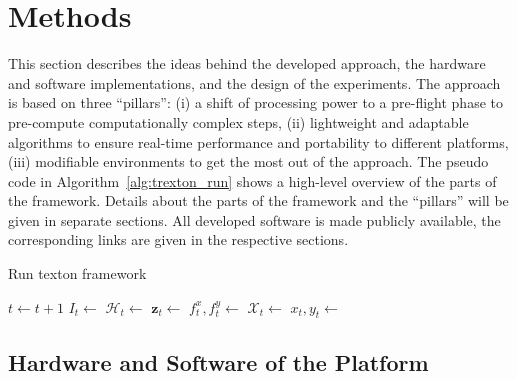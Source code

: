\documentclass{report}
\begin{document}
\chapter{Methods}
\label{chap:methods}

This section describes the ideas behind the developed approach, the
hardware and software implementations, and the design of the
experiments.
The approach is based on three ``pillars'': (i) a shift of processing
power to a pre-flight phase to pre-compute computationally complex
steps, (ii) lightweight and adaptable algorithms to ensure real-time
performance and portability to different platforms, (iii) modifiable
environments to get the most out of the approach. The pseudo code in
Algorithm~\ref{alg:trexton_run} shows a high-level overview of the
parts of the framework. Details about the parts of the framework and
the ``pillars'' will be given in separate sections. All developed
software is made publicly available, the corresponding links are given
in the respective sections.
\begin{algorithm}
    \caption{Run texton framework}
    \label{alg:trexton_run}
    \begin{algorithmic}[1]
       \State $t \gets t+1$ \State
      $I_t \gets$  \State
      $\mathcal{H}_t \gets$ 
      \State $\mathbf{z}_t \gets$
       \State $f_t^x, f_t^y \gets$
       \State $\mathcal{X}_t \gets$
       \State $x_t, y_t \gets$
      \EndProcedure
    \end{algorithmic}
  \end{algorithm}  
\section{Hardware and Software of the Platform}
\label{sec:hardware}
\end{document}
